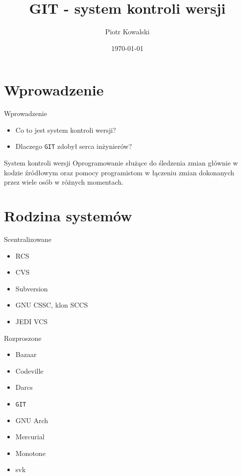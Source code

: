 \documentclass{beamer}
\title[GIT]{GIT - system kontroli wersji}
\author{Piotr Kowalski}
\institute{Wyższa Szkoła Informatyki Stosowanej i Zarządzania}
\date{\today}
\begin{document}
	

\begin{frame}
  \titlepage
\end{frame}


\section{Wprowadzenie}

\begin{frame}{Wprowadzenie}
\begin{itemize}
  \item Co to jest system kontroli wersji?
  \item Dlaczego \texttt{GIT} zdobył serca inżynierów?
\end{itemize}
\vskip 1cm
\begin{block}{System kontroli wersji}
Oprogramowanie służące do śledzenia zmian głównie w kodzie źródłowym oraz pomocy programistom w łączeniu zmian dokonanych przez wiele osób w różnych momentach.
\end{block}
\end{frame}


\section{Rodzina systemów}

\begin{frame}{Scentralizowane}
\begin{itemize}
  \item RCS
  \item CVS
  \item Subversion
  \item GNU CSSC, klon SCCS
  \item JEDI VCS
\end{itemize}
\end{frame}

\begin{frame}{Rozproszone}
\begin{itemize}
  \item Bazaar
  \item Codeville
  \item Darcs
  \item \texttt{GIT}
  \item GNU Arch
  \item Mercurial
  \item Monotone
  \item svk
\end{itemize}
\end{frame}
\end{document}
